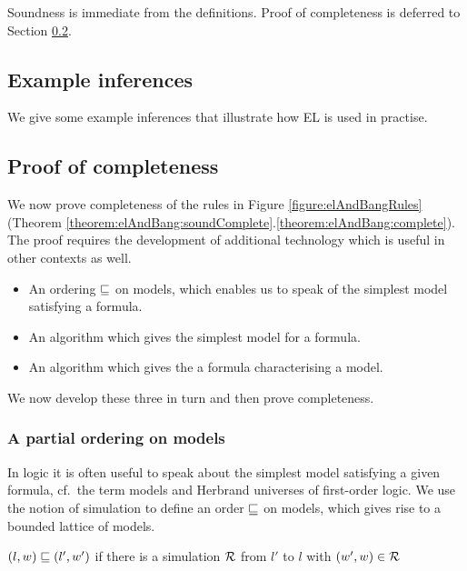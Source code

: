 \NI Soundness is immediate from the definitions. Proof of completeness is
deferred to Section \ref{completenessProof}. 

\subsection{Example inferences}

We give some example inferences that illustrate how EL is used in
practise.

\subsection{Proof of completeness}\label{completenessProof}

\NI We now prove completeness of the rules in Figure
\ref{figure:elAndBangRules} (Theorem
\ref{theorem:elAndBang:soundComplete}.\ref{theorem:elAndBang:complete}).
The proof requires the development of additional technology which is
useful in other contexts as well.

\begin{itemize}

\item An ordering $\sqsubseteq$ on models, which enables us to speak of the
  simplest model satisfying a formula.

\item An algorithm which gives the simplest model for a formula.

\item An algorithm which gives the a formula characterising a model.

\end{itemize}

\NI We now develop these three in turn and then prove completeness.

\subsubsection{A partial ordering on models}

\NI In logic it is often useful to speak about the simplest model
satisfying a given formula, cf.~the term models and Herbrand universes
of first-order logic. We use the notion of simulation to define an
order $\sqsubseteq$ on models, which gives rise to a bounded lattice of
models.

\begin{definition}
$(l,w) \sqsubseteq (l',w')$ if there is a simulation $\mathcal{R}$ from $l'$ to $l$
  with $(w',w) \in \mathcal{R}$
\end{definition}

